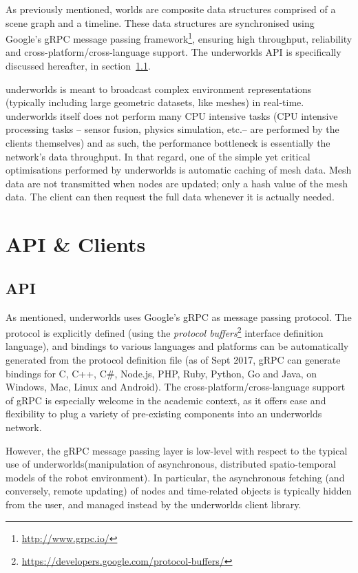 \documentclass[conference]{IEEEtran}
\newcommand{\etc}{etc.\xspace}
\newcommand{\uwds}{{\sc underworlds}\xspace}
\begin{document}
As previously mentioned, worlds are composite data structures comprised of a
scene graph and a timeline. These data structures are synchronised using
Google's gRPC message passing framework\footnote{\url{http://www.grpc.io/}}, ensuring
high throughput, reliability and cross-platform/cross-language support. The \uwds
API is specifically discussed hereafter, in section~\ref{api}.


\uwds is meant to broadcast complex environment representations (typically
including large geometric datasets, like meshes) in real-time. \uwds itself does
not perform many CPU intensive tasks (CPU intensive processing tasks -- sensor
fusion, physics simulation, \etc -- are performed by the clients themselves) and
as such, the performance bottleneck is essentially the network's data
throughput.  In that regard, one of the simple yet critical optimisations
performed by \uwds is automatic caching of mesh data. Mesh data are not
transmitted when nodes are updated; only a hash value of the mesh data. The
client can then request the full data whenever it is actually needed.



\section{API \& Clients}

\subsection{API}
\label{api}

As mentioned, \uwds uses Google's gRPC as message passing protocol. The protocol
is explicitly defined (using the \emph{protocol
buffers}\footnote{\url{https://developers.google.com/protocol-buffers/}}
interface definition language), and bindings to various languages and platforms
can be automatically generated from the protocol definition file (as of Sept
2017, gRPC can generate bindings for C, C++, C\#, Node.js, PHP, Ruby, Python, Go
and Java, on Windows, Mac, Linux and Android).  The cross-platform/cross-language support
of gRPC is especially welcome in the academic context, as it offers ease and
flexibility to plug a variety of pre-existing components into an \uwds network.


However, the gRPC message passing layer is low-level with respect to the typical
use of \uwds (manipulation of asynchronous, distributed spatio-temporal models
of the robot environment). In particular, the asynchronous fetching (and
conversely, remote updating) of nodes and time-related objects is typically
hidden from the user, and managed instead by the \uwds client library.
\end{document}

